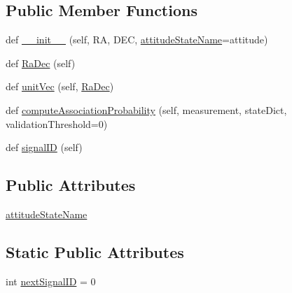 \subsection*{Public Member Functions}
\begin{DoxyCompactItemize}
\item 
def \hyperlink{classmodest_1_1signals_1_1pointsource_1_1PointSource_a32143ad5b008b5e763fb2bb4cd984924}{\+\_\+\+\_\+init\+\_\+\+\_\+} (self, RA, D\+EC, \hyperlink{classmodest_1_1signals_1_1pointsource_1_1PointSource_a0924a2233bb4fd23e50d024e4f1b048e}{attitude\+State\+Name}=\textquotesingle{}attitude\textquotesingle{})
\item 
def \hyperlink{classmodest_1_1signals_1_1pointsource_1_1PointSource_a295eb1a487e18c77029585ac2785db80}{Ra\+Dec} (self)
\item 
def \hyperlink{classmodest_1_1signals_1_1pointsource_1_1PointSource_aa51308fcb654e7183d332ed824965397}{unit\+Vec} (self, \hyperlink{classmodest_1_1signals_1_1pointsource_1_1PointSource_a295eb1a487e18c77029585ac2785db80}{Ra\+Dec})
\item 
def \hyperlink{classmodest_1_1signals_1_1pointsource_1_1PointSource_a8bdf640e312bbf3a56efd0e89d496361}{compute\+Association\+Probability} (self, measurement, state\+Dict, validation\+Threshold=0)
\item 
def \hyperlink{classmodest_1_1signals_1_1signalsource_1_1SignalSource_a9a64c6a9c2954f6ad61e4ca3518ea8ab}{signal\+ID} (self)
\end{DoxyCompactItemize}
\subsection*{Public Attributes}
\begin{DoxyCompactItemize}
\item 
\hyperlink{classmodest_1_1signals_1_1pointsource_1_1PointSource_a0924a2233bb4fd23e50d024e4f1b048e}{attitude\+State\+Name}
\end{DoxyCompactItemize}
\subsection*{Static Public Attributes}
\begin{DoxyCompactItemize}
\item 
int \hyperlink{classmodest_1_1signals_1_1signalsource_1_1SignalSource_a453eafb550b551adbec0903deb63dfce}{next\+Signal\+ID} = 0
\end{DoxyCompactItemize}

